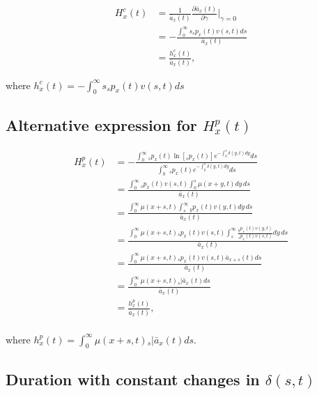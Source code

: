 \documentclass[12pt]{article}
\begin{document}
\begin{equation}\label{eq:EntropyConst3}
\begin{split}
{H}^{c}_x(t)&=\frac{1}{\bar{a}_x(t)}\frac{\partial \bar{a}_x(t)}{\partial \gamma} \bigg\rvert_{\gamma=0}\\
&= -\frac{\int_0^\infty s {}_sp_x(t) {v}(s,t)ds}{\bar{a}_x(t)} \\
&= \frac{{h}^{c}_x(t)}{\bar{a}_x(t)},
\end{split}
\end{equation}

where ${h}^{c}_x(t)=-\int_0^\infty s {}_sp_x(t) {v}(s,t)ds$



\subsection{Alternative expression for ${H}^{p}_{x}(t)$}\label{sec:EntropyAlt}

\begin{equation} \label{eq:EntropyAnnuityA1}
\begin{split}
{H}^{p}_{x}(t) &= -\frac{ \int_{0}^{\infty}{}_sp_x(t)\ln[{}_sp_x(t)] e^{-\int_{0}^{s}\delta(y,t)dy} ds}{\int_0^\infty {}_sp_x(t) e^{-\int_{0}^{s}\delta(y,t)dy} ds}\\
&= \frac{\int_0^\infty {}_sp_x(t) {v}(s,t) \int_0^s \mu(x+y,t) dy\,ds}{\bar{a}_x(t)}\\
&= \frac{\int_0^\infty  \mu(x+s,t) \int_s^\infty {}_yp_x(t) {v}(y,t)  dy\,ds}{\bar{a}_x(t)}\\
&= \frac{\int_0^\infty  \mu(x+s,t)  {}_sp_x(t) {v}(s,t) \int_s^\infty \frac{ {}_yp_x(t) {v}(y,t)}{ {}_sp_x(t) {v}(s,t)}  dy\,ds}{\bar{a}_x(t)}\\
&=  \frac{\int_0^\infty \mu(x+s,t)   {}_sp_x(t) {v}(s,t) \bar{a}_{x+s}(t) ds}{\bar{a}_x(t)} \\
&=  \frac{\int_0^\infty \mu(x+s,t)  {}_s|\bar{a}_x(t) ds}{\bar{a}_x(t)} \\
&=  \frac{{h}^{p}_{x}(t)}{\bar{a}_x(t)}, \\
\end{split}
\end{equation}

where ${h}^{p}_{x}(t)=\int_0^\infty \mu(x+s,t)   {}_s|\bar{a}_x(t) ds$.



\subsection{Duration with constant changes in $\delta(s,t)$}\label{sec:DurConst}
\end{document}
